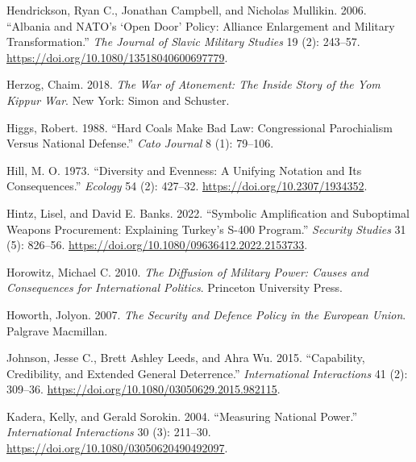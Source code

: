 \documentclass[
  12,
  letterpaper,
  DIV=11,
  numbers=noendperiod]{scrartcl}
\newlength{\cslhangindent}
\newlength{\cslentryspacingunit} %
\newenvironment{CSLReferences}[2] %
 {%
  \setlength{\parindent}{0pt}
  \ifodd #1
  \let\oldpar\par
  \def\par{\hangindent=\cslhangindent\oldpar}
  \fi
  \setlength{\parskip}{#2\cslentryspacingunit}
 }%
 {}
\begin{document}
\begin{CSLReferences}{1}{0}
\leavevmode{}%
Hendrickson, Ryan C., Jonathan Campbell, and Nicholas Mullikin. 2006.
{``Albania and {NATO}'s {`{Open Door}'} {Policy}: {Alliance Enlargement}
and {Military Transformation}.''} \emph{The Journal of Slavic Military
Studies} 19 (2): 243--57.
\url{https://doi.org/10.1080/13518040600697779}.

\leavevmode{}%
Herzog, Chaim. 2018. \emph{The {War} of {Atonement}: {The Inside Story}
of the {Yom Kippur War}}. {New York}: {Simon and Schuster}.

\leavevmode{}%
Higgs, Robert. 1988. {``Hard {Coals Make Bad Law}: {Congressional
Parochialism} Versus {National Defense}.''} \emph{Cato Journal} 8 (1):
79--106.

\leavevmode{}%
Hill, M. O. 1973. {``Diversity and {Evenness}: {A Unifying Notation} and
{Its Consequences}.''} \emph{Ecology} 54 (2): 427--32.
\url{https://doi.org/10.2307/1934352}.

\leavevmode{}%
Hintz, Lisel, and David E. Banks. 2022. {``Symbolic {Amplification} and
{Suboptimal Weapons Procurement}: {Explaining Turkey}'s {S-400
Program}.''} \emph{Security Studies} 31 (5): 826--56.
\url{https://doi.org/10.1080/09636412.2022.2153733}.

\leavevmode{}%
Horowitz, Michael C. 2010. \emph{The {Diffusion} of {Military Power}:
{Causes} and {Consequences} for {International Politics}}. {Princeton
University Press}.

\leavevmode{}%
Howorth, Jolyon. 2007. \emph{The {Security} and {Defence Policy} in the
{European Union}}. {Palgrave Macmillan}.

\leavevmode{}%
Johnson, Jesse C., Brett Ashley Leeds, and Ahra Wu. 2015. {``Capability,
{Credibility}, and {Extended General Deterrence}.''} \emph{International
Interactions} 41 (2): 309--36.
\url{https://doi.org/10.1080/03050629.2015.982115}.

\leavevmode{}%
Kadera, Kelly, and Gerald Sorokin. 2004. {``Measuring {National
Power}.''} \emph{International Interactions} 30 (3): 211--30.
\url{https://doi.org/10.1080/03050620490492097}.


\end{CSLReferences}
\end{document}
